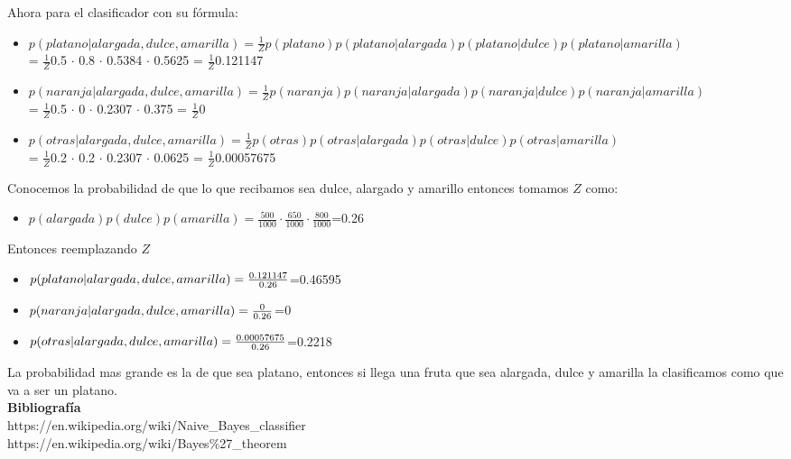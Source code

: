 \documentclass{article}
\begin{document}
  Ahora para el clasificador con su fórmula:
  \begin{itemize}
   \item $p(platano|alargada,dulce,amarilla)=\frac{1}{Z}p(platano)p(platano|alargada)p(platano|dulce)p(platano|amarilla)$ \\=
   $\frac{1}{Z}$0.5 $\cdot$ 0.8 $\cdot$ 0.5384 $\cdot$ 0.5625 = $\frac{1}{Z}$0.121147
   \item $p(naranja|alargada,dulce,amarilla)=\frac{1}{Z}p(naranja)p(naranja|alargada)p(naranja|dulce)p(naranja|amarilla)$ \\=
   $\frac{1}{Z}$0.5 $\cdot$ 0 $\cdot$ 0.2307 $\cdot$ 0.375 = $\frac{1}{Z}$0
   \item $p(otras|alargada,dulce,amarilla)=\frac{1}{Z}p(otras)p(otras|alargada)p(otras|dulce)p(otras|amarilla)$ \\=
   $\frac{1}{Z}$0.2 $\cdot$ 0.2 $\cdot$ 0.2307 $\cdot$ 0.0625 = $\frac{1}{Z}$0.00057675
  \end{itemize}
  Conocemos la probabilidad de que lo que recibamos sea dulce, alargado y amarillo entonces tomamos $Z$ como:
  \begin{itemize}
   \item $p(alargada)p(dulce)p(amarilla) = \frac{500}{1000}\cdot\frac{650}{1000}\cdot\frac{800}{1000}$=0.26
  \end{itemize}
  Entonces reemplazando $Z$
  \begin{itemize}
   \item $p(platano|alargada,dulce,amarilla) = \frac{0\ldotp121147}{0\ldotp26}$=0.46595
   \item $p(naranja|alargada,dulce,amarilla) = \frac{0}{0\ldotp26}$=0
   \item $p(otras|alargada,dulce,amarilla) = \frac{0\ldotp00057675}{0\ldotp26}$=0.2218
  \end{itemize}
  La probabilidad mas grande es la de que sea platano, entonces si llega una fruta que sea alargada, dulce y amarilla la clasificamos como que va a ser un 
  platano.\\
{\bf Bibliografía}\\
https://en.wikipedia.org/wiki/Naive\_Bayes\_classifier\\
https://en.wikipedia.org/wiki/Bayes\%27\_theorem

 
\end{document}

